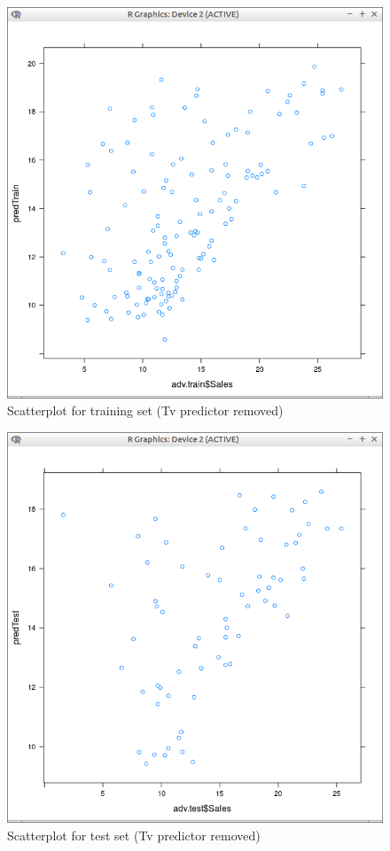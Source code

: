 \documentclass[10pt,a4paper]{article}
\begin{document}
\begin{figure}[H]
\centering
\includegraphics[width=140mm]{figures/pltNoTvTrain.png}
\caption{Scatterplot for training set (Tv predictor removed) \label{overflow}}
\end{figure}

\begin{figure}[H]
\centering
\includegraphics[width=140mm]{figures/pltNoTvTest.png}
\caption{Scatterplot for test set (Tv predictor removed) \label{overflow}}
\end{figure}
\vspace{5cm}
\end{document}

